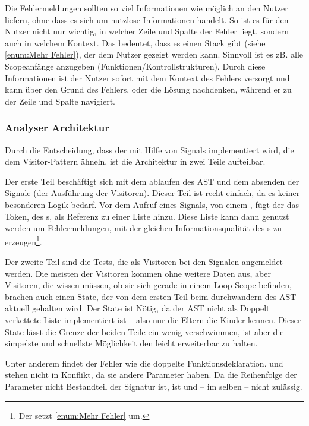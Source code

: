 {      Die Fehlermeldungen sollten so viel Informationen wie möglich an den Nutzer liefern, ohne dass es sich um nutzlose Informationen handelt. So ist es für den Nutzer nicht nur wichtig, in welcher Zeile und Spalte der Fehler liegt, sondern auch in welchem Kontext. Das bedeutet, dass es einen Stack gibt (siehe \ref{enum:Mehr Fehler}), der dem Nutzer gezeigt werden kann. Sinnvoll ist es zB. alle Scopeanfänge anzugeben (Funktionen/Kontrollstrukturen). Durch diese Informationen ist der Nutzer sofort mit dem Kontext des Fehlers versorgt und kann über den Grund des Fehlers, oder die Lösung  nachdenken, während er zu der Zeile und Spalte navigiert.

    \subsubsection{Analyser Architektur}
    \label{sssec:Analyser Architektur}
      Durch die Entscheidung, dass der  mit Hilfe von Signals implementiert wird, die dem Visitor-Pattern ähneln, ist die Architektur in zwei Teile aufteilbar.

      Der erste Teil beschäftigt sich mit dem ablaufen des AST und dem absenden der Signale (der Ausführung der Visitoren). Dieser Teil ist recht einfach, da es keiner besonderen Logik bedarf. Vor dem Aufruf eines Signals, von einem , fügt der  das Token, des s, als Referenz zu einer Liste hinzu. Diese Liste kann dann genutzt werden um Fehlermeldungen, mit der gleichen Informationsqualität des s zu erzeugen\footnote{
        Der  setzt \ref{enum:Mehr Fehler} um.
      }.

      Der zweite Teil sind die Tests, die als Visitoren bei den Signalen angemeldet werden. Die meisten der Visitoren kommen ohne weitere Daten aus, aber Visitoren, die wissen müssen, ob sie sich gerade in einem Loop Scope befinden, brachen auch einen State, der von dem ersten Teil beim durchwandern des AST aktuell gehalten wird. Der State ist Nötig, da der AST nicht als Doppelt verkettete Liste implementiert ist -- also nur die Eltern die Kinder kennen. Dieser State lässt die Grenze der beiden Teile ein wenig verschwimmen, ist aber die simpelste und schnellste Möglichkeit den  leicht erweiterbar zu halten.

      Unter anderem findet der  Fehler wie die doppelte Funktionsdeklaration.  und  stehen nicht in Konflikt, da sie andere Parameter haben. Da die Reihenfolge der Parameter nicht Bestandteil der Signatur ist, ist  und  -- im selben  -- nicht zulässig.

}
